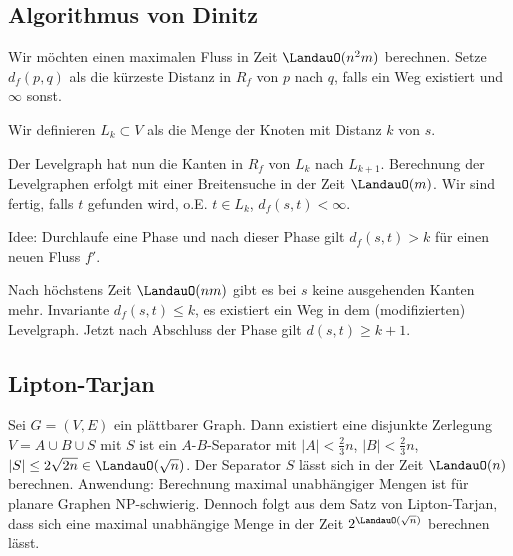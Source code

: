 

\subsection{Algorithmus von Dinitz}


Wir möchten einen maximalen Fluss in Zeit $\LandauO(n^2m)$ berechnen.
Setze $d_f(p,q)$ als die kürzeste Distanz in $R_f$ von $p$ nach $q$, falls ein Weg existiert und $\infty$ sonst.

Wir definieren $L_k \subset V$ als die Menge der Knoten mit Distanz $k$ von $s$.

Der Levelgraph hat nun die Kanten in $R_f$ von $L_k$ nach $L_{k+1}$.
Berechnung der Levelgraphen erfolgt mit einer Breitensuche in der Zeit $\LandauO(m)$.
Wir sind fertig, falls $t$ gefunden wird, o.E. $t \in L_k$, $d_f(s,t) < \infty$.

Idee: Durchlaufe eine Phase und nach dieser Phase gilt $d_f(s,t) > k$ für einen neuen Fluss $f'$.

\begin{algorithmic}
    \Else
    \EndIf
\end{algorithmic}
Nach höchstens Zeit $\LandauO(nm)$ gibt es bei $s$ keine ausgehenden Kanten mehr.
Invariante $d_f(s,t) \le k$, es existiert ein Weg in dem (modifizierten) Levelgraph.
Jetzt nach Abschluss der Phase gilt $d(s,t) \ge k + 1$.


\subsection{Lipton-Tarjan}

Sei $G = (V,E)$ ein plättbarer Graph.
Dann existiert eine disjunkte Zerlegung $V = A \cup B \cup S$ mit $S$ ist ein $A$-$B$-Separator mit $|A| < \frac{2}{3} n$, $|B| < \frac{2}{3}n$, $|S| \le 2 \sqrt{2n} \in \LandauO(\sqrt n)$.
Der Separator $S$ lässt sich in der Zeit $\LandauO(n)$ berechnen.
Anwendung: Berechnung maximal unabhängiger Mengen ist für planare Graphen NP-schwierig.
Dennoch folgt aus dem Satz von Lipton-Tarjan, dass sich eine maximal unabhängige Menge in der Zeit $2^{\LandauO(\sqrt n)}$ berechnen lässt.

